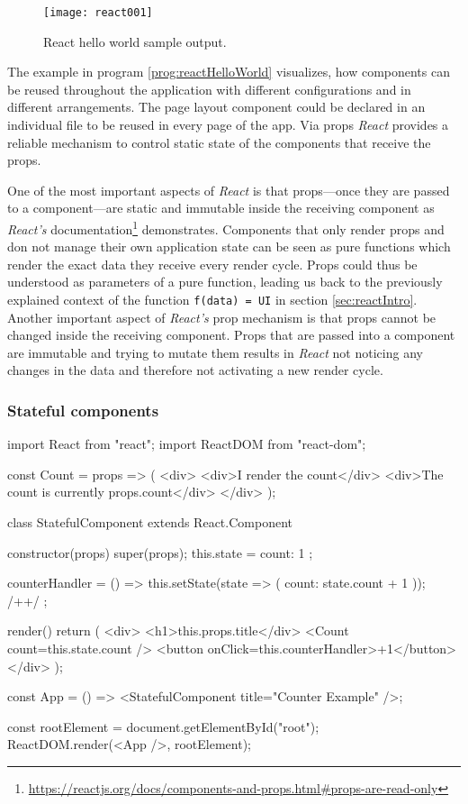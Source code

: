 \begin{figure}
  \centering
  \texttt{[image: react001]}
  \caption{React hello world sample output.}
  \label{fig:reactHelloWorld}
\end{figure}

The example in program \ref{prog:reactHelloWorld} visualizes, how components can be reused throughout the application with different configurations and in different arrangements. The page layout component could be declared in an individual file to be reused in every page of the app. Via props \emph{React} provides a reliable mechanism to control static state of the components that receive the props.

One of the most important aspects of \emph{React} is that props---once they are passed to a component---are static and immutable inside the receiving component as \emph{React's} documentation\footnote{\url{https://reactjs.org/docs/components-and-props.html\#props-are-read-only}} demonstrates. Components that only render props and don not manage their own application state can be seen as pure functions which render the exact data they receive every render cycle. Props could thus be understood as parameters of a pure function, leading us back to the previously explained context of the function \texttt{f(data) = UI} in section \ref{sec:reactIntro}. Another important aspect of \emph{React's} prop mechanism is that props cannot be changed inside the receiving component. Props that are passed into a component are immutable and trying to mutate them results in \emph{React} not noticing any changes in the data and therefore not activating a new render cycle.

\subsubsection{Stateful components}

\begin{program}
\caption{Simple example of a \emph{React} component and its usage.} 
\label{prog:reactStateful}
\begin{JsCode}
import React from "react";
import ReactDOM from "react-dom";

const Count = props => (
  <div>
    <div>I render the count</div>
    <div>The count is currently {props.count}</div>
  </div>
);

class StatefulComponent extends React.Component {
  constructor(props) {
    super(props);
    this.state = {
      count: 1
    };
  }

  counterHandler = () => {
    this.setState(state => ({ count: state.count + 1 })); /+\label{line:setState}+/
  };

  render() {
    return (
      <div>
        <h1>{this.props.title}</div>
        <Count count={this.state.count} />
        <button onClick={this.counterHandler}>+1</button>
      </div>
    );
  }
}

const App = () => <StatefulComponent title={"Counter Example"} />;

const rootElement = document.getElementById("root");
ReactDOM.render(<App />, rootElement);
\end{JsCode}
\end{program}

